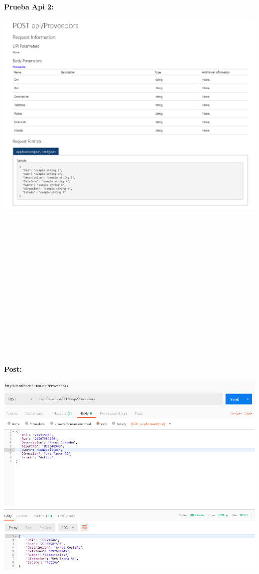 \begin{flushleft}
\textbf{}\\
\textbf{}\\
\textbf{}\\
\textbf{}\\
\textbf{Prueba Api 2:}\\
\begin{center}
	\includegraphics[width=19cm]{./Imagenes/api2} 
	\end{center}
\textbf{}\\
\textbf{}\\
\textbf{}\\
\textbf{}\\
\textbf{}\\
\textbf{}\\
\textbf{}\\
\textbf{}\\
\textbf{}\\
\textbf{}\\
\textbf{}\\
\textbf{}\\
\textbf{}\\
\textbf{}\\
\textbf{}\\
\textbf{Post:}\\
\begin{center}
	\includegraphics[width=19cm]{./Imagenes/post2} 

\end{center}
\end{flushleft}
